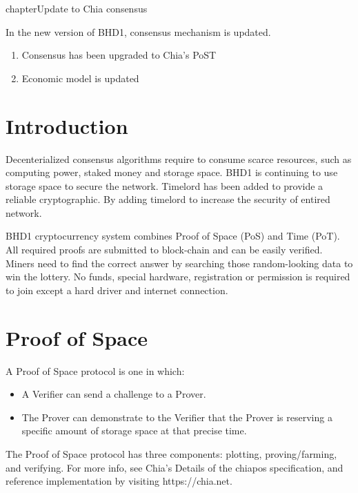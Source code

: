 chapter{Update to Chia consensus}
\begin{flushleft}
    In the new version of BHD1, consensus mechanism is updated.
    \begin{enumerate}
        \item Consensus has been upgraded to Chia's PoST
        \item Economic model is updated
    \end{enumerate}
\end{flushleft}
\section{Introduction}
\begin{flushleft}
    Decenterialized consensus algorithms require to consume scarce resources, such as computing power, staked money and storage space. BHD1 is continuing to use storage space to secure the network. Timelord has been added to provide a reliable cryptographic. By adding timelord to increase the security of entired network.
\end{flushleft}
\begin{flushleft}
    BHD1 cryptocurrency system combines Proof of Space (PoS) and Time (PoT). All required proofs are submitted to block-chain and can be easily verified. Miners need to find the correct answer by searching those random-looking data to win the lottery. No funds, special hardware, registration or permission is required to join except a hard driver and internet connection.
\end{flushleft}
\section{Proof of Space}
\begin{flushleft}
    A Proof of Space protocol is one in which:
\end{flushleft}
\begin{itemize}
    \item A Verifier can send a challenge to a Prover.
    \item The Prover can demonstrate to the Verifier that the Prover is reserving a specific amount of storage space at that precise time.
\end{itemize}
\begin{flushleft}
    The Proof of Space protocol has three components: plotting, proving/farming, and verifying. For more info, see Chia's Details of the chiapos specification, and reference implementation by visiting https://chia.net.
\end{flushleft}

